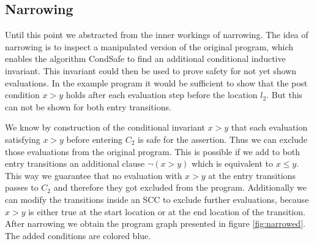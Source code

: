 \subsection{Narrowing}

Until this point we abstracted from the inner workings of narrowing.
The idea of narrowing is to inspect a manipulated version of the original program, which enables the algorithm CondSafe to find an additional conditional inductive invariant.
This invariant could then be used to prove safety for not yet shown evaluations.
In the example program it would be sufficient to show that the post condition $x > y$ holds after each evaluation step before the location $l_2$.
But this can not be shown for both entry transitions.

We know by construction of the conditional invariant $x > y$ that each evaluation satisfying $x > y$ before entering $C_2$ is safe for the assertion.
Thus we can exclude those evaluations from the original program.
This is possible if we add to both entry transitions an additional clause $\neg (x > y)$ which is equivalent to $x \leq y$.
This way we guarantee that no evaluation with $x > y$ at the entry transitions passes to $C_2$ and therefore they got excluded from the program.
Additionally we can modify the transitions inside an SCC to exclude further evaluations, because $x > y$ is either true at the start location or at the end location of the transition.
After narrowing we obtain the program graph presented in figure \ref{fig:narrowed}. The added conditions are colored blue.

